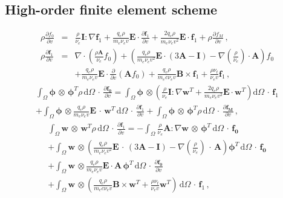 \documentclass[review]{elsarticle}
\newcommand{\pdv}[2]{\frac{\partial{#1}}{\partial{#2}}}
\newcommand{\vect}[1]{\boldsymbol{#1}}
\newcommand{\matr}[1]{\mathbf{#1}}
\newcommand{\dI}{\text{d}}
\newcommand{\nue}{\nu_{e}}
\newcommand{\nutot}{\nu_{t}}
\newcommand{\vmag}{v}
\newcommand{\E}{\vect{E}}
\newcommand{\B}{\vect{B}}
\newcommand{\qe}{q_e}
\newcommand{\me}{m_e}
\newcommand{\fM}{f_M}
\newcommand{\fzero}{f_0}
\newcommand{\fone}{\vect{f}_1}
\newcommand{\MI}{\matr{I}}
\newcommand{\MA}{\matr{A}}
\begin{document}
\subsection{High-order finite element scheme}\label{sec:hos}
\begin{eqnarray}
  \rho \pdv{\fzero}{\vmag} &=& 
  \frac{\rho}{\nue}\MI:\nabla\fone + 
  \frac{\qe\rho}{\me\nue\vmag}\E\cdot\pdv{\fone}{\vmag}
  + \frac{2 \qe\rho}{\me\nue\vmag^2}\E\cdot\fone + \rho \pdv{\fM}{\vmag}\, , 
  \label{eq:M1hosf0}\\
  \rho \pdv{\fone}{\vmag} &=&
  \nabla\cdot\left(\frac{\rho\MA}{\nue}\fzero\right) +
  \left(\frac{\qe\rho}{\me\nue\vmag^2}\E\cdot\left( 3\MA - \MI \right) - 
  \nabla\left( \frac{\rho}{\nue}\right)\cdot\MA \right)\fzero \nonumber\\
  &&+ \frac{\qe\rho}{\me\nue\vmag}\E\cdot\pdv{}{\vmag}
  \left( \MA\fzero\right) + \frac{\qe\rho}{\me c \nue\vmag}\B\times\fone + 
  \frac{\rho \nutot}{\nue\vmag}\fone\, ,
  \label{eq:M1hosf1}
\end{eqnarray}
\begin{multline}
  \int_{\Omega}\vect{\phi}\, \otimes\, \vect{\phi}^T 
  \rho\, \dI \Omega\, \cdot\, \pdv{\vect{\fzero}}{\vmag} = 
  \int_{\Omega}\vect{\phi}\, \otimes \left(
  \frac{\rho}{\nue}\MI:\nabla\vect{w}^T + 
  \frac{2 \qe\rho}{\me\nue\vmag^2}\E\cdot\vect{w}^T \right)\dI \Omega
  \, \cdot\, \fone \\
  + \int_{\Omega}\vect{\phi}\, \otimes
  \frac{\qe\rho}{\me\nue\vmag}\E\, \cdot\, \vect{w}^T\, \dI \Omega\, 
  \cdot\, \pdv{\fone}{\vmag} + 
  \int_{\Omega}\vect{\phi}\, \otimes\, \vect{\phi}^T \rho\, \dI\Omega\,
  \cdot\, \pdv{\vect{\fM}}{\vmag}
  \, , 
  \label{eq:FEM1hosf0}
\end{multline}
\begin{multline}
  \int_{\Omega}\vect{w}\, \otimes\, \vect{w}^T \rho\, \dI\Omega\, \cdot\,  
  \pdv{\fone}{\vmag} =
  - \int_{\Omega}\frac{\rho}{\nue} \MA : \nabla\vect{w}\, \otimes\,
  \vect{\phi}^T\, \dI \Omega\, 
  \cdot\, \vect{\fzero} \\
  + \int_{\Omega}\vect{w}\, \otimes
  \left(\frac{\qe\rho}{\me\nue\vmag^2}\E\, \cdot\, \left( 3\MA - \MI \right) - 
  \nabla\left(\frac{\rho}{\nue}\right)\, \cdot\, \MA \right)\vect{\phi}^T\, 
  \dI\Omega\, \cdot\, \vect{\fzero} \\
  + \int_{\Omega}\vect{w}\, \otimes
  \frac{\qe\rho}{\me\nue\vmag}\E \cdot \MA\, \vect{\phi}^T\, \dI \Omega\, 
  \cdot\, \pdv{\vect{\fzero}}{\vmag}\\
  + \int_{\Omega}\vect{w}\, \otimes
  \left(\frac{\qe\rho}{\me c \nue\vmag}\B\times\vect{w}^T + 
  \frac{\rho \nutot}{\nue\vmag} \vect{w}^T\right)\, \dI\Omega\, 
  \cdot\, \fone\, ,
  \label{eq:FEM1hosf1}
\end{multline}
\end{document}
